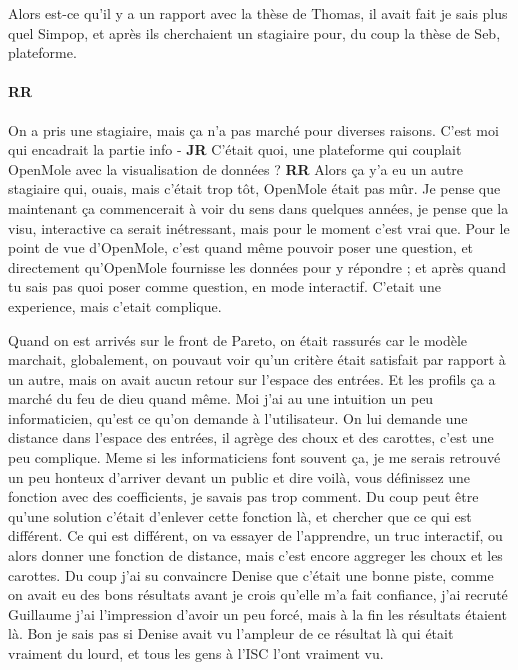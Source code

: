 \documentclass[12pt]{article}
\begin{document}
Alors est-ce qu'il y a un rapport avec la thèse de Thomas, il avait fait je sais plus quel Simpop, et après ils cherchaient un stagiaire pour, du coup la thèse de Seb, plateforme.

\paragraph{RR}

On a pris une stagiaire, mais ça n'a pas marché pour diverses raisons. C'est moi qui encadrait la partie info - \textbf{JR} C'était quoi, une plateforme qui couplait OpenMole avec la visualisation de données ? \textbf{RR} Alors ça y'a eu un autre stagiaire qui, ouais, mais c'était trop tôt, OpenMole était pas mûr. Je pense que maintenant ça commencerait à voir du sens dans quelques années, je pense que la visu, interactive ca serait inétressant, mais pour le moment c'est vrai que. Pour le point de vue d'OpenMole, c'est quand même pouvoir poser une question, et directement qu'OpenMole fournisse les données pour y répondre ; et après quand tu sais pas quoi poser comme question, en mode interactif. C'etait une experience, mais c'etait complique. 


Quand on est arrivés sur le front de Pareto, on était rassurés car le modèle marchait, globalement, on pouvaut voir qu'un critère était satisfait par rapport à un autre, mais on avait aucun retour sur l'espace des entrées. Et les profils ça a marché du feu de dieu quand même. Moi j'ai au une intuition un peu informaticien, qu'est ce qu'on demande à l'utilisateur. On lui demande une distance dans l'espace des entrées, il agrège des choux et des carottes, c'est une peu complique. Meme si les informaticiens font souvent ça, je me serais retrouvé un peu honteux d'arriver devant un public et dire voilà, vous définissez une fonction avec des coefficients, je savais pas trop comment. Du coup peut être qu'une solution c'était d'enlever cette fonction là, et chercher que ce qui est différent. Ce qui est différent, on va essayer de l'apprendre, un truc interactif, ou alors donner une fonction de distance, mais c'est encore aggreger les choux et les carottes. Du coup j'ai su convaincre Denise que c'était une bonne piste, comme on avait eu des bons résultats avant je crois qu'elle m'a fait confiance,%
j'ai recruté Guillaume j'ai l'impression d'avoir un peu forcé, mais à la fin les résultats étaient là. Bon je sais pas si Denise avait vu l'ampleur de ce résultat là qui était vraiment du lourd, et tous les gens à l'ISC l'ont vraiment vu.
\end{document}
